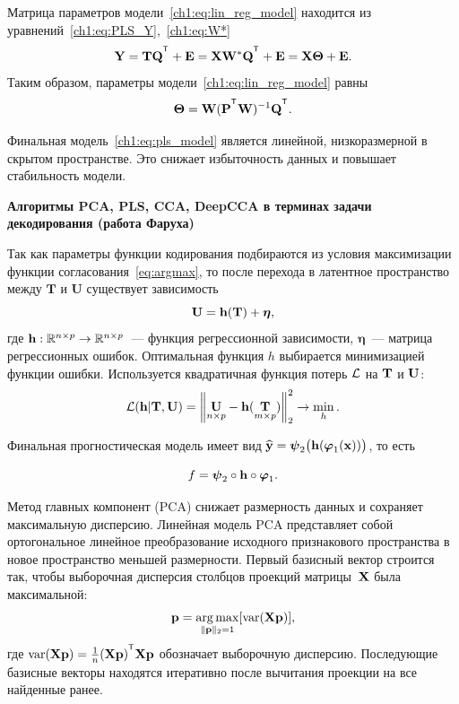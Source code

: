 Матрица параметров модели~\ref{ch1:eq:lin_reg_model} находится из уравнений~\eqref{ch1:eq:PLS_Y},~\eqref{ch1:eq:W*}
\begin{equation*}
	\bY = \bT \bQ^{\T} + \bE = \bX \bW^* \bQ^{\T} + \bE = \bX \bTheta + \bE.
	\label{ch1:eq:pls_model}
\end{equation*}
Таким образом, параметры модели~\eqref{ch1:eq:lin_reg_model} равны
\begin{equation}
	\bTheta = \bW (\bP^{\T} \bW)^{-1} \bQ^{\T}.
	\label{ch1:eq:linear_regression_model_parameters}
\end{equation}

Финальная модель~\eqref{ch1:eq:pls_model} является линейной, низкоразмерной в скрытом пространстве. 
Это снижает избыточность данных и повышает стабильность модели.

\hrulefill

\textbf{Алгоритмы PCA, PLS, CCA, DeepCCA в терминах задачи декодирования (работа Фаруха)}

Так как параметры функции кодирования подбираются из условия максимизации функции согласования~\eqref{eq:argmax}, то после перехода в латентное пространство между $\mathbf{T}$ и $\mathbf{U}$ существует зависимость
\begin{equation}
	\mathbf{U} = \mathbf{h}(\mathbf{T}) +  \boldsymbol{\eta},
	\label{eq:reg2}
\end{equation}
где $\mathbf{h}: \mathbb{R}^{n \times p} \to \mathbb{R}^{n \times p}$~--- функция регрессионной зависимости,  $\boldsymbol{\eta}$~--- матрица регрессионных ошибок.
Оптимальная функция $h$ выбирается минимизацией функции ошибки. Используется квадратичная функция потерь $\mathcal{L}$ на $\mathbf{T}$ и $\mathbf{U}$:
\begin{equation}
	\mathcal{L}(\mathbf{h} | {\mathbf{T}}, {\mathbf{U}}) = {\left\| \underset{n \times p}{\mathbf{U}}  - \mathbf{h}(\underset{m \times p}{\mathbf{T}}) \right\| }_2^2 \rightarrow\min_{h}.
	\label{eq:loss_function}
\end{equation}

Финальная прогностическая модель имеет вид
$\widehat{\mathbf{y}} = \boldsymbol{\psi}_2\bigl(\mathbf{h}(\boldsymbol{\varphi}_1(\mathbf{x}))\bigr)$, то есть

\begin{equation}
	f = \boldsymbol{\psi}_2 \circ \mathbf{h} \circ \boldsymbol{\varphi}_1.
	\label{eq:f}
\end{equation}

Метод главных компонент (PCA) снижает размерность данных и сохраняет максимальную дисперсию. Линейная модель PCA представляет собой ортогональное линейное преобразование исходного признакового пространства в новое пространство меньшей размерности. Первый базисный вектор строится так, чтобы выборочная дисперсия столбцов проекций матрицы~$\mathbf{X}$ была максимальной:
\begin{equation}
	\mathbf{p} = \mathop{\arg \max}\limits_{\|\mathbf{p}\|_{2} = 1} [\text{var}(\mathbf{X} \textbf{p})],
	\label{eq:PCA}
\end{equation}
где $\text{var}(\bX \textbf{p}) = \frac{1}{n} (\bX \textbf{p})^{\T}\bX \textbf{p}$ обозначает выборочную дисперсию. Последующие базисные векторы находятся итеративно после вычитания проекции на все найденные ранее.

